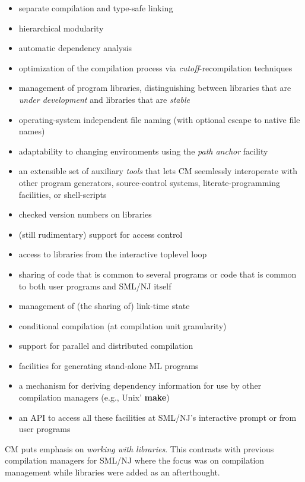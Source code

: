 \documentclass[titlepage,letterpaper]{article}
\begin{document}
\begin{itemize}
\item separate compilation and type-safe linking~\cite{appel94:sepcomp}
\item hierarchical modularity~\cite{blume:appel:cm99}
\item automatic dependency analysis~\cite{blume:depend99}
\item optimization of the compilation process via {\em
cutoff}-recompilation techniques~\cite{tichy94}
\item management of program libraries, distinguishing between libraries
that are {\em under development} and libraries that are {\em stable}
\item operating-system independent file naming (with optional escape
to native file names)
\item adaptability to changing environments using the {\em path anchor}
facility
\item an extensible set of auxiliary {\em tools} that lets CM
seemlessly interoperate with other program generators, source-control
systems, literate-programming facilities, or shell-scripts
\item checked version numbers on libraries
\item (still rudimentary) support for access control
\item access to libraries from the interactive toplevel loop
\item sharing of code that is common to several programs or code that
is common to both user programs and SML/NJ itself
\item management of (the sharing of) link-time state
\item conditional compilation (at compilation unit granularity)
\item support for parallel and distributed compilation
\item facilities for generating stand-alone ML programs
\item a mechanism for deriving dependency information for use
by other compilation managers (e.g., Unix' {\bf make})
\item an API to access all these facilities at SML/NJ's interactive
prompt or from user programs
\end{itemize}

CM puts emphasis on {\em working with libraries}.  This contrasts with
previous compilation managers for SML/NJ where the focus was on
compilation management while libraries were added as an afterthought.
\end{document}
